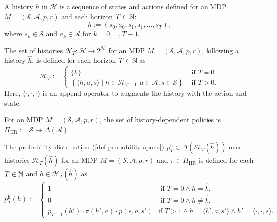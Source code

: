 \begin{definition}[History]
  A history $h$ in $\mathcal{H}$ is a sequence of states and actions defined for an MDP $M = (\mathcal{S}, \mathcal{A}, p, r)$ and each horizon $T \in \mathbb{N}$:
  \[
    h := (s_0, a_0, s_1, a_1, \dots , s_T),
  \]
  where $s_k \in \mathcal{S}$ and $a_k\in \mathcal{A}$ for $k = 0, \dots , T-1$.
  \leanok
\end{definition}

\begin{definition}[Histories]
  The set of histories $\mathcal{H}_T \colon  \mathcal{H} \to 2^{\mathcal{H}}$ for an MDP $M = (\mathcal{S}, \mathcal{A}, p, r)$, following a history $\hat{h}$, is defined for each horizon $T \in \mathbb{N}$ as
  \[
    \mathcal{H}_T :=
    \begin{cases}
        \{ \hat{h} \} &\text{ if } T = 0 \\      
        \left\{ \langle h, a, s \rangle \mid h \in \mathcal{H}_{T-1}, a\in \mathcal{A}, s\in \mathcal{S} \right\} &\text{ if } T > 0.
    \end{cases}
  \]
  Here, $\langle \cdot , \cdot , \cdot  \rangle$ is an append operator to augments the history with the action and state.
  \leanok
\end{definition}

\begin{definition}
  For an MDP $M = (\mathcal{S}, \mathcal{A}, p, r)$, the set of history-dependent policies is $\Pi_{\mathrm{HR}} := \mathcal{S} \to \Delta(\mathcal{A})$.
  \leanok
\end{definition}

\begin{definition}
  The probability distribution (\cref{def:probability-space}) $p^{\mathrm{h}}_T \in \Delta(\mathcal{H}_T(\hat{h}))$ over histories $\mathcal{H}_T(\hat{h})$ for an MDP $M = (\mathcal{S}, \mathcal{A}, p, r)$ and $\pi \in \Pi_{\mathrm{HR}}$ is defined for each $T \in \mathbb{N}$ and $h\in \mathcal{H}_T(\hat{h})$ as
  \[
    p^{\mathrm{h}}_T(h) :=
    \begin{cases}
      1 & \text{ if } T = 0 \wedge h = \hat{h}, \\
      0 & \text{ if } T = 0 \wedge h \neq  \hat{h}, \\
      p_{T-1}(h') \cdot \pi(h',a) \cdot  p(s, a , s') &\text{if } T > 1 \wedge h = \langle h', a, s' \rangle \wedge h' = \langle \cdot , \cdot , s \rangle.
    \end{cases}
  \]
  \leanok
\end{definition}

